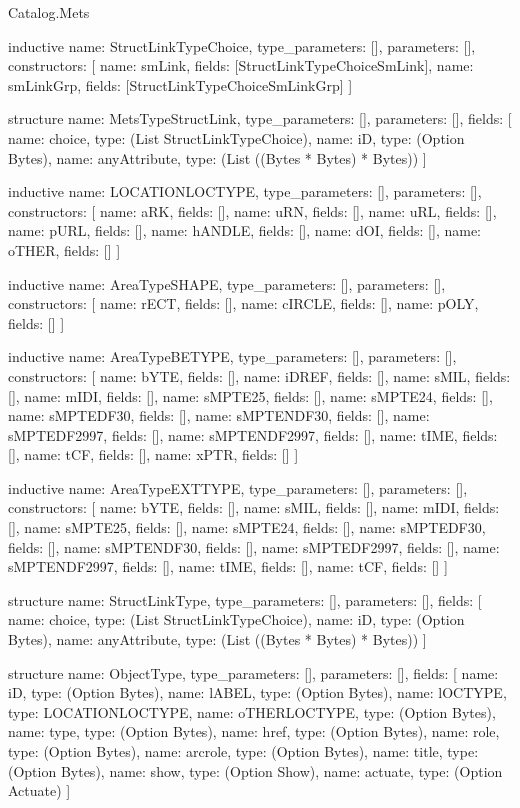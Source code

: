 \begin{lexlean}{Catalog.Mets}
\begin{semanticmodule}
inductive{
  name: StructLinkTypeChoice,
  type_parameters: [],
  parameters: [],
  constructors: [
    {name: smLink, fields: [StructLinkTypeChoiceSmLink]},
    {name: smLinkGrp, fields: [StructLinkTypeChoiceSmLinkGrp]}
  ]
}

structure{
  name: MetsTypeStructLink,
  type_parameters: [],
  parameters: [],
  fields: [
    {name: choice, type: (List StructLinkTypeChoice)},
    {name: iD, type: (Option Bytes)},
    {name: anyAttribute, type: (List ((Bytes * Bytes) * Bytes))}
  ]
}

inductive{
  name: LOCATIONLOCTYPE,
  type_parameters: [],
  parameters: [],
  constructors: [
    {name: aRK, fields: []},
    {name: uRN, fields: []},
    {name: uRL, fields: []},
    {name: pURL, fields: []},
    {name: hANDLE, fields: []},
    {name: dOI, fields: []},
    {name: oTHER, fields: []}
  ]
}

inductive{
  name: AreaTypeSHAPE,
  type_parameters: [],
  parameters: [],
  constructors: [
    {name: rECT, fields: []},
    {name: cIRCLE, fields: []},
    {name: pOLY, fields: []}
  ]
}

inductive{
  name: AreaTypeBETYPE,
  type_parameters: [],
  parameters: [],
  constructors: [
    {name: bYTE, fields: []},
    {name: iDREF, fields: []},
    {name: sMIL, fields: []},
    {name: mIDI, fields: []},
    {name: sMPTE25, fields: []},
    {name: sMPTE24, fields: []},
    {name: sMPTEDF30, fields: []},
    {name: sMPTENDF30, fields: []},
    {name: sMPTEDF2997, fields: []},
    {name: sMPTENDF2997, fields: []},
    {name: tIME, fields: []},
    {name: tCF, fields: []},
    {name: xPTR, fields: []}
  ]
}

inductive{
  name: AreaTypeEXTTYPE,
  type_parameters: [],
  parameters: [],
  constructors: [
    {name: bYTE, fields: []},
    {name: sMIL, fields: []},
    {name: mIDI, fields: []},
    {name: sMPTE25, fields: []},
    {name: sMPTE24, fields: []},
    {name: sMPTEDF30, fields: []},
    {name: sMPTENDF30, fields: []},
    {name: sMPTEDF2997, fields: []},
    {name: sMPTENDF2997, fields: []},
    {name: tIME, fields: []},
    {name: tCF, fields: []}
  ]
}

structure{
  name: StructLinkType,
  type_parameters: [],
  parameters: [],
  fields: [
    {name: choice, type: (List StructLinkTypeChoice)},
    {name: iD, type: (Option Bytes)},
    {name: anyAttribute, type: (List ((Bytes * Bytes) * Bytes))}
  ]
}

structure{
  name: ObjectType,
  type_parameters: [],
  parameters: [],
  fields: [
    {name: iD, type: (Option Bytes)},
    {name: lABEL, type: (Option Bytes)},
    {name: lOCTYPE, type: LOCATIONLOCTYPE},
    {name: oTHERLOCTYPE, type: (Option Bytes)},
    {name: type, type: (Option Bytes)},
    {name: href, type: (Option Bytes)},
    {name: role, type: (Option Bytes)},
    {name: arcrole, type: (Option Bytes)},
    {name: title, type: (Option Bytes)},
    {name: show, type: (Option Show)},
    {name: actuate, type: (Option Actuate)}
  ]
}


\end{semanticmodule}
\end{lexlean}
